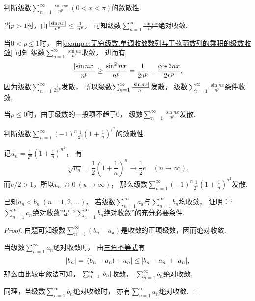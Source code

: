 \begin{example}
判断级数\(\sum_{n=1}^\infty \frac{\sin nx}{n^p}\ (0<x<\pi)\)的敛散性.
\begin{solution}
当\(p>1\)时，由\(\frac{\abs{\sin nx}}{n^p} \leq \frac1{n^p}\)，
可知级数\(\sum_{n=1}^\infty \frac{\sin nx}{n^p}\)绝对收敛.

当\(0<p\leq1\)时，
由\cref{example:无穷级数.单调收敛数列与正弦函数列的乘积的级数收敛} 可知
级数\(\sum_{n=1}^\infty \frac{\sin nx}{n^p}\)收敛，
进而有\[
	\frac{\abs{\sin nx}}{n^p}
	\geq \frac{\sin^2nx}{n^p}
	= \frac1{2n^p} - \frac{\cos2nx}{2n^p},
\]
因为级数\(\sum_{n=1}^\infty \frac1{2n^p}\)发散，
所以级数\(\sum_{n=1}^\infty \frac{\abs{\sin nx}}{n^p}\)发散，
级数\(\sum_{n=1}^\infty \frac{\sin nx}{n^p}\)条件收敛.

当\(p\leq0\)时，由于级数的一般项不趋于\(0\)，
级数\(\sum_{n=1}^\infty \frac{\sin nx}{n^p}\)发散.
\end{solution}
\end{example}

\begin{example}
判断级数\(\sum_{n=1}^\infty (-1)^n \frac1{2^n} \left(1+\frac1n\right)^{n^2}\)的敛散性.
\begin{solution}
记\(u_n = \frac1{2^n} \left(1+\frac1n\right)^{n^2}\)，
有\[
	\sqrt[n]{u_n}
	= \frac12 \left(1+\frac1n\right)^n
	\to \frac12 e \quad(n\to\infty),
\]
而\(e/2>1\)，所以\(u_n \not\to 0\ (n\to\infty)\)，
那么级数\(\sum_{n=1}^\infty (-1)^n \frac1{2^n} \left(1+\frac1n\right)^{n^2}\)发散.
\end{solution}
\end{example}

\begin{example}
已知\(a_n < b_n\ (n=1,2,\dotsc)\)，
若级数\(\sum_{n=1}^\infty a_n\)与\(\sum_{n=1}^\infty b_n\)均收敛，
证明：“\(\sum_{n=1}^\infty a_n\)绝对收敛”是
“\(\sum_{n=1}^\infty b_n\)绝对收敛”的充分必要条件.
\begin{proof}
由题可知级数\(\sum_{n=1}^\infty (b_n - a_n)\)是收敛的正项级数，因而绝对收敛.

当级数\(\sum_{n=1}^\infty a_n\)绝对收敛时，
由\hyperref[theorem:不等式.三角不等式1]{三角不等式}有\[
	\abs{b_n} = \abs{(b_n - a_n) + a_n}
	\leq \abs{b_n - a_n} + \abs{a_n},
\]
那么由\hyperref[theorem:无穷级数.正项级数的比较审敛法]{比较审敛法}可知，
\(\sum_{n=1}^\infty \abs{b_n}\)收敛，
\(\sum_{n=1}^\infty b_n\)绝对收敛.

同理，当级数\(\sum_{n=1}^\infty b_n\)绝对收敛时，
亦有\(\sum_{n=1}^\infty a_n\)绝对收敛.
\end{proof}
\end{example}

